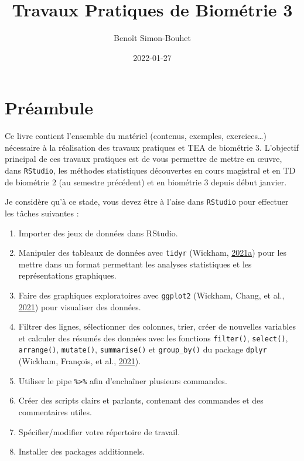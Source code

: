 \documentclass[
  a4paper,
]{article}
\title{Travaux Pratiques de Biométrie 3}
\author{Benoît Simon-Bouhet}
\date{2022-01-27}
\providecommand{\tightlist}{%
  \setlength{\itemsep}{0pt}\setlength{\parskip}{0pt}}
\begin{document}
\maketitle

{
\hypersetup{linkcolor=}
\setcounter{tocdepth}{2}
\tableofcontents
}
\hypertarget{pruxe9ambule}{%
\section{Préambule}\label{pruxe9ambule}}

Ce livre contient l'ensemble du matériel (contenus, exemples, exercices\ldots) nécessaire à la réalisation des travaux pratiques et TEA de biométrie 3. L'objectif principal de ces travaux pratiques est de vous permettre de mettre en œuvre, dans \texttt{RStudio}, les méthodes statistiques découvertes en cours magistral et en TD de biométrie 2 (au semestre précédent) et en biométrie 3 depuis début janvier.

Je considère qu'à ce stade, vous devez être à l'aise dans \texttt{RStudio} pour effectuer les tâches suivantes :

\begin{enumerate}
\def\labelenumi{\arabic{enumi}.}
\tightlist
\item
  Importer des jeux de données dans RStudio.
\item
  Manipuler des tableaux de données avec \texttt{tidyr} (Wickham, \protect\hyperlink{ref-R-tidyr}{2021}\protect\hyperlink{ref-R-tidyr}{a}) pour les mettre dans un format permettant les analyses statistiques et les représentations graphiques.
\item
  Faire des graphiques exploratoires avec \texttt{ggplot2} (Wickham, Chang, et al., \protect\hyperlink{ref-R-ggplot2}{2021}) pour visualiser des données.
\item
  Filtrer des lignes, sélectionner des colonnes, trier, créer de nouvelles variables et calculer des résumés des données avec les fonctions \texttt{filter()}, \texttt{select()}, \texttt{arrange()}, \texttt{mutate()}, \texttt{summarise()} et \texttt{group\_by()} du package \texttt{dplyr} (Wickham, François, et al., \protect\hyperlink{ref-R-dplyr}{2021}).
\item
  Utiliser le pipe \texttt{\%\textgreater{}\%} afin d'enchaîner plusieurs commandes.
\item
  Créer des scripts clairs et parlants, contenant des commandes et des commentaires utiles.
\item
  Spécifier/modifier votre répertoire de travail.
\item
  Installer des packages additionnels.
\end{enumerate}
\end{document}
